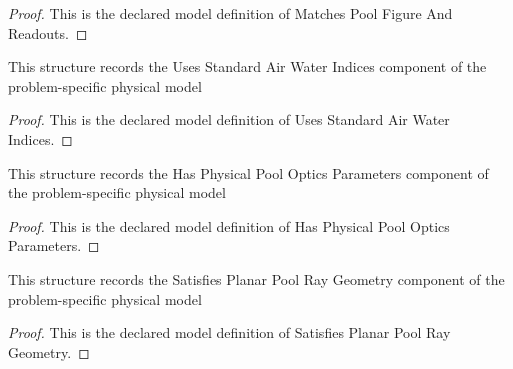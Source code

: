 \begin{proof}
  This is the declared model definition of Matches Pool Figure And Readouts.
\end{proof}
\begin{definition}
  \label{def:physics:phyx-mini-0135:phyxminiproblems-problemphyxmini0135-usesstandardairwaterindices}
  This structure records the Uses Standard Air Water Indices component of the problem-specific physical model
\end{definition}
\begin{proof}
  This is the declared model definition of Uses Standard Air Water Indices.
\end{proof}
\begin{definition}
  \label{def:physics:phyx-mini-0135:phyxminiproblems-problemphyxmini0135-hasphysicalpoolopticsparameters}
  This structure records the Has Physical Pool Optics Parameters component of the problem-specific physical model
\end{definition}
\begin{proof}
  This is the declared model definition of Has Physical Pool Optics Parameters.
\end{proof}
\begin{definition}
  \label{def:physics:phyx-mini-0135:phyxminiproblems-problemphyxmini0135-satisfiesplanarpoolraygeometry}
  This structure records the Satisfies Planar Pool Ray Geometry component of the problem-specific physical model
\end{definition}
\begin{proof}
  This is the declared model definition of Satisfies Planar Pool Ray Geometry.
\end{proof}
